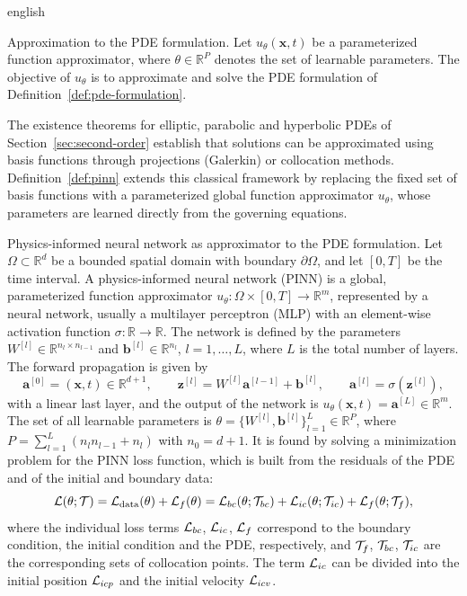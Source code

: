 \documentclass[0000.tex]{subfiles}
\begin{document}
\begin{hyphenrules}{english}
\begin{definicion}{Approximation to the PDE formulation.}\label{def:pde-approx}
Let $u_\theta(\mathbf{x},t)$ be a parameterized function approximator, where $\theta\in\mathbb{R}^P$ denotes the set of
learnable parameters. The objective of $u_\theta$ is to approximate and solve the PDE formulation of
Definition~\ref{def:pde-formulation}.
\end{definicion}

The existence theorems for elliptic, parabolic and hyperbolic PDEs of Section~\ref{sec:second-order} establish
that solutions can be approximated using basis functions through projections (Galerkin) or collocation
methods. Definition~\ref{def:pinn} extends this classical framework by replacing the fixed set of basis functions
with a parameterized global function approximator $u_\theta$, whose parameters are learned directly from
the governing equations.

\begin{definicion}{Physics-informed neural network as approximator to the PDE formulation.}\label{def:pinn}
Let $\Omega\subset\mathbb{R}^d$ be a bounded spatial domain with boundary $\partial\Omega$, and let $[0,T]$ be
the time interval. A physics-informed neural network (PINN) is a global, parameterized function
approximator $u_\theta:\Omega\times[0,T]\to\mathbb{R}^{m}$, represented by a neural network, usually a
multilayer perceptron (MLP) with an element-wise activation function $\sigma:\mathbb{R}\to\mathbb{R}$. The network is
defined by the parameters $W^{[l]}\in\mathbb{R}^{n_l\times n_{l-1}}$ and $\mathbf{b}^{[l]}\in\mathbb{R}^{n_l}$,
$l=1,\dots,L$, where $L$ is the total number of layers. The forward propagation is given by
\cite{goodfellow2016}
\[
  \mathbf{a}^{[0]}=(\mathbf{x},t)\in\mathbb{R}^{d+1},\qquad
  \mathbf{z}^{[l]}=W^{[l]}\mathbf{a}^{[l-1]}+\mathbf{b}^{[l]},\qquad
  \mathbf{a}^{[l]}=\sigma(\mathbf{z}^{[l]}),
\]
with a linear last layer, and the output of the network is $u_\theta(\mathbf{x},t)=\mathbf{a}^{[L]}\in\mathbb{R}^m$. The
set of all learnable parameters is $\theta=\{W^{[l]},\mathbf{b}^{[l]}\}_{l=1}^{L}\in\mathbb{R}^{P}$, where
$P=\sum_{l=1}^{L}(n_ln_{l-1}+n_l)$ with $n_0=d+1$. It is found by solving a minimization problem for the
PINN loss function, which is built from the residuals of the PDE and of the initial and boundary data:
\[
  \mathcal{L}(\theta;\mathcal{T})=\mathcal{L}_{\mathrm{data}}(\theta)+\mathcal{L}_f(\theta)
  =\mathcal{L}_{bc}(\theta;\mathcal{T}_{bc})+\mathcal{L}_{ic}(\theta;\mathcal{T}_{ic})+\mathcal{L}_f(\theta;\mathcal{T}_f),
\]
where the individual loss terms $\mathcal{L}_{bc}$, $\mathcal{L}_{ic}$, $\mathcal{L}_f$ correspond to the boundary
condition, the initial condition and the PDE, respectively, and $\mathcal{T}_f$, $\mathcal{T}_{bc}$, $\mathcal{T}_{ic}$ are the
corresponding sets of collocation points. The term $\mathcal{L}_{ic}$ can be divided into the initial
position $\mathcal{L}_{icp}$ and the initial velocity $\mathcal{L}_{icv}$.
\end{definicion}


\end{hyphenrules}
\end{document}
